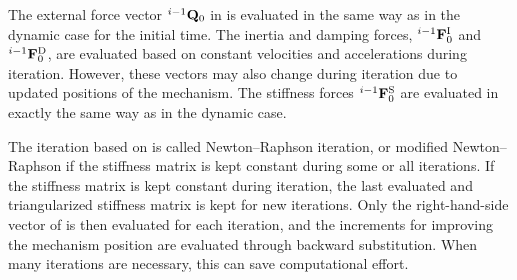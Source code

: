 The external force vector ${}^{i-1}{\bf Q}_0$ in 
is evaluated in the same way as in the dynamic case for the initial time.
The inertia and damping forces, ${}^{i-1}{\bf F}^{\rm I}_0$ and ${}^{i-1}{\bf F}^{\rm D}_0$,
are evaluated based on constant velocities and accelerations during iteration.
However, these vectors may also change during iteration due to updated positions
of the mechanism.
The stiffness forces ${}^{i-1}{\bf F}^{\rm S}_0$ are evaluated in exactly the same way
as in the dynamic case.

The iteration based on  is called Newton--Raphson
iteration, or modified Newton--Raphson if the stiffness matrix is kept constant
during some or all iterations.
If the stiffness matrix is kept constant during iteration, the last evaluated
and triangularized stiffness matrix is kept for new iterations.
Only the right-hand-side vector of  is then evaluated
for each iteration, and the increments for improving the mechanism position
are evaluated through backward substitution.
When many iterations are necessary, this can save computational effort.


